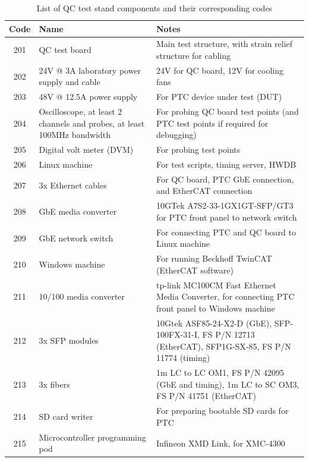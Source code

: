 \documentclass[a4paper,12pt]{article}
\begin{document}
\begin{table}[h]
    \centering
    \renewcommand{\arraystretch}{1.1} 
    \begin{tabularx}{\textwidth}{|c|X|X|}
        \hline
        \textbf{Code} & \textbf{Name} & \textbf{Notes} \\ 
        \hline
        201 & QC test board &  Main test structure, with strain relief structure for cabling \\ 
        \hline
        202 & 24V @ 3A laboratory power supply and cable  &  24V for QC board, 12V for cooling fans \\ 
        \hline
        203 & 48V @ 12.5A power supply  &  For PTC device under test (DUT) \\ 
        \hline
        204 & Oscilloscope, at least 2 channels and probes, at least 100MHz bandwidth  &  For probing QC board test points (and PTC test points if required for debugging) \\ 
        \hline
        205 & Digital volt meter (DVM)  &  For probing test points\\ 
        \hline
        206 & Linux machine  &  For test scripts, timing server, HWDB \\ 
        \hline
        207 & 3x Ethernet cables  &  For QC board, PTC GbE connection, and EtherCAT connection \\ 
        \hline
        208 & GbE media converter & 10GTek A7S2-33-1GX1GT-SFP/GT3 for PTC front panel to network switch \\ 
        \hline
        209 & GbE network switch & For connecting PTC and QC board to Linux machine  \\ 
        \hline
        210 & Windows machine  & For running Beckhoff TwinCAT (EtherCAT software) \\ 
        \hline
        211 & 10/100 media converter &  tp-link MC100CM Fast Ethernet Media Converter, for connecting PTC front panel to Windows machine \\ 
        \hline
        212 & 3x SFP modules & 10Gtek ASF85-24-X2-D (GbE), SFP-100FX-31-I, FS P/N 12713 (EtherCAT), SFP1G-SX-85, FS P/N 11774 (timing) \\ 
        \hline
        213 & 3x fibers & 1m LC to LC OM1, FS P/N 42095 (GbE and timing), 1m LC to SC OM3, FS P/N 41751 (EtherCAT) \\
        \hline
        214 & SD card writer & For preparing bootable SD cards for PTC \\
        \hline
        215 & Microcontroller programming pod & Infineon XMD Link, for XMC-4300 \\
        \hline
    \end{tabularx}
    \caption{List of QC test stand components and their corresponding codes}
    \label{tab:qc_components}
\end{table}
\end{document}
